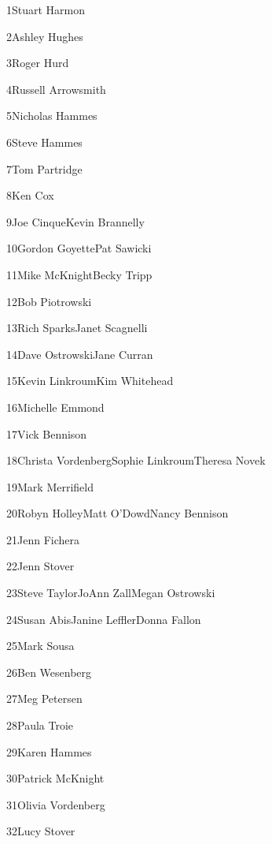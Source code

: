 \parbox[t]{4.75in}{1\hfil\break Stuart Harmon}\hfil\break\vskip 0.25in
\parbox[t]{4.75in}{2\hfil\break Ashley Hughes}\hfil\break\vskip 0.25in
\parbox[t]{4.75in}{3\hfil\break Roger Hurd}\hfil\break\vskip 0.25in
\parbox[t]{4.75in}{4\hfil\break Russell Arrowsmith}\hfil\break\vskip 0.25in
\parbox[t]{4.75in}{5\hfil\break Nicholas Hammes}\hfil\break\vskip 0.25in
\parbox[t]{4.75in}{6\hfil\break Steve Hammes}\hfil\break\vskip 0.25in
\parbox[t]{4.75in}{7\hfil\break Tom Partridge}\hfil\break\vskip 0.25in
\parbox[t]{4.75in}{8\hfil\break Ken Cox}\hfil\break\vskip 0.25in
\parbox[t]{4.75in}{9\hfil\break Joe Cinque\hfil\break Kevin Brannelly}\hfil\break\vskip 0.25in
\parbox[t]{4.75in}{10\hfil\break Gordon Goyette\hfil\break Pat Sawicki}\hfil\break\vskip 0.25in
\parbox[t]{4.75in}{11\hfil\break Mike McKnight\hfil\break Becky Tripp}\hfil\break\vskip 0.25in
\parbox[t]{4.75in}{12\hfil\break Bob Piotrowski}\hfil\break\vskip 0.25in
\parbox[t]{4.75in}{13\hfil\break Rich Sparks\hfil\break Janet Scagnelli}\hfil\break\vskip 0.25in
\parbox[t]{4.75in}{14\hfil\break Dave Ostrowski\hfil\break Jane Curran}\hfil\break\vskip 0.25in
\parbox[t]{4.75in}{15\hfil\break Kevin Linkroum\hfil\break Kim Whitehead}\hfil\break\vskip 0.25in
\parbox[t]{4.75in}{16\hfil\break Michelle Emmond}\hfil\break\vskip 0.25in
\parbox[t]{4.75in}{17\hfil\break Vick Bennison}\hfil\break\vskip 0.25in
\parbox[t]{4.75in}{18\hfil\break Christa Vordenberg\hfil\break Sophie Linkroum\hfil\break Theresa Novek}\hfil\break\vskip 0.25in
\parbox[t]{4.75in}{19\hfil\break Mark Merrifield}\hfil\break\vskip 0.25in
\parbox[t]{4.75in}{20\hfil\break Robyn Holley\hfil\break Matt O'Dowd\hfil\break Nancy Bennison}\hfil\break\vskip 0.25in
\parbox[t]{4.75in}{21\hfil\break Jenn Fichera}\hfil\break\vskip 0.25in
\parbox[t]{4.75in}{22\hfil\break Jenn Stover}\hfil\break\vskip 0.25in
\parbox[t]{4.75in}{23\hfil\break Steve Taylor\hfil\break JoAnn Zall\hfil\break Megan Ostrowski}\hfil\break\vskip 0.25in
\parbox[t]{4.75in}{24\hfil\break Susan Abis\hfil\break Janine Leffler\hfil\break Donna Fallon}\hfil\break\vskip 0.25in
\parbox[t]{4.75in}{25\hfil\break Mark Sousa}\hfil\break\vskip 0.25in
\parbox[t]{4.75in}{26\hfil\break Ben Wesenberg}\hfil\break\vskip 0.25in
\parbox[t]{4.75in}{27\hfil\break Meg Petersen}\hfil\break\vskip 0.25in
\parbox[t]{4.75in}{28\hfil\break Paula Troie}\hfil\break\vskip 0.25in
\parbox[t]{4.75in}{29\hfil\break Karen Hammes}\hfil\break\vskip 0.25in
\parbox[t]{4.75in}{30\hfil\break Patrick McKnight}\hfil\break\vskip 0.25in
\parbox[t]{4.75in}{31\hfil\break Olivia Vordenberg}\hfil\break\vskip 0.25in
\parbox[t]{4.75in}{32\hfil\break Lucy Stover}\hfil\break\vskip 0.25in
